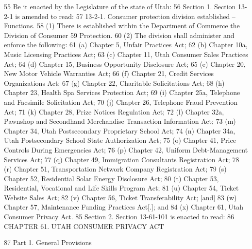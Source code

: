 55     Be it enacted by the Legislature of the state of Utah:
56          Section 1. Section 13-2-1 is amended to read:
57          13-2-1. Consumer protection division established -- Functions.
58          (1) There is established within the Department of Commerce the Division of Consumer
59     Protection.
60          (2) The division shall administer and enforce the following:
61          (a) Chapter 5, Unfair Practices Act;
62          (b) Chapter 10a, Music Licensing Practices Act;
63          (c) Chapter 11, Utah Consumer Sales Practices Act;
64          (d) Chapter 15, Business Opportunity Disclosure Act;
65          (e) Chapter 20, New Motor Vehicle Warranties Act;
66          (f) Chapter 21, Credit Services Organizations Act;
67          (g) Chapter 22, Charitable Solicitations Act;
68          (h) Chapter 23, Health Spa Services Protection Act;
69          (i) Chapter 25a, Telephone and Facsimile Solicitation Act;
70          (j) Chapter 26, Telephone Fraud Prevention Act;
71          (k) Chapter 28, Prize Notices Regulation Act;
72          (l) Chapter 32a, Pawnshop and Secondhand Merchandise Transaction Information Act;
73          (m) Chapter 34, Utah Postsecondary Proprietary School Act;
74          (n) Chapter 34a, Utah Postsecondary School State Authorization Act;
75          (o) Chapter 41, Price Controls During Emergencies Act;
76          (p) Chapter 42, Uniform Debt-Management Services Act;
77          (q) Chapter 49, Immigration Consultants Registration Act;
78          (r) Chapter 51, Transportation Network Company Registration Act;
79          (s) Chapter 52, Residential Solar Energy Disclosure Act;
80          (t) Chapter 53, Residential, Vocational and Life Skills Program Act;
81          (u) Chapter 54, Ticket Website Sales Act;
82          (v) Chapter 56, Ticket Transferability Act; [and]
83          (w) Chapter 57, Maintenance Funding Practices Act[.]; and
84          (x) Chapter 61, Utah Consumer Privacy Act.
85          Section 2. Section 13-61-101 is enacted to read:
86     
CHAPTER 61. UTAH CONSUMER PRIVACY ACT

87     
Part 1. General Provisions

